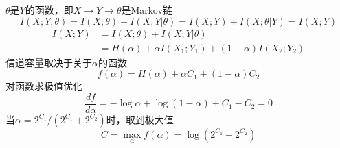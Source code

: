 \documentclass[a4paper]{exam}
\begin{document}
\begin{CJK*}{UTF8}{gbsn}
\begin{questions}
\begin{solution}
  $\theta$是$Y$的函数，即$X \to Y \to \theta $是Markov链
  \[I(X;Y,\theta ) = I(X;\theta ) + I(X;Y|\theta ) = I(X;Y) + I(X;\theta |Y) = I(X;Y)\]
  \begin{equation*}
  \begin{split}
  I(X;Y) &= I(X;\theta ) + I(X;Y|\theta )\\
  &= H(\alpha) + \alpha I({X_1};{Y_1}) + (1 - \alpha )I({X_2};{Y_2})
  \end{split}
  \end{equation*}
  信道容量取决于关于$\alpha$的函数
  \[f(\alpha ) = H(\alpha ) + \alpha {C_1} + (1 - \alpha ){C_2}\]
  对函数求极值优化 \[\frac{{df}}{{d\alpha }} =  - \log \alpha  + \log (1 - \alpha ) + {C_1} - {C_2} = 0\]
  当$\alpha  = {2^{{C_1}}}/({2^{{C_1}}} + {2^{{C_2}}})$时，取到极大值
  \[C = \mathop {\max }\limits_\alpha  f(\alpha ) = \log ({2^{{C_1}}} + {2^{{C_2}}})\]
    \end{solution}
    \newpage
\end{questions}
\end{CJK*}
\end{document}

